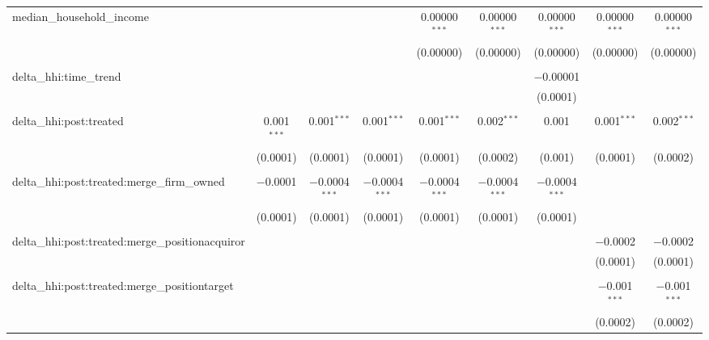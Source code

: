 \begin{table}[H]
{\begin{tabular}{@{\extracolsep{5pt}}lcccccccc}
  median\_household\_income &  &  &  & 0.00000$^{***}$ & 0.00000$^{***}$ & 0.00000$^{***}$ & 0.00000$^{***}$ & 0.00000$^{***}$ \\  

   &  &  &  & (0.00000) & (0.00000) & (0.00000) & (0.00000) & (0.00000) \\  

   & & & & & & & & \\  

  delta\_hhi:time\_trend &  &  &  &  &  & $-$0.00001 &  &  \\  

   &  &  &  &  &  & (0.0001) &  &  \\  

   & & & & & & & & \\  

  delta\_hhi:post:treated & 0.001$^{***}$ & 0.001$^{***}$ & 0.001$^{***}$ & 0.001$^{***}$ & 0.002$^{***}$ & 0.001 & 0.001$^{***}$ & 0.002$^{***}$ \\  

   & (0.0001) & (0.0001) & (0.0001) & (0.0001) & (0.0002) & (0.001) & (0.0001) & (0.0002) \\  

   & & & & & & & & \\  

  delta\_hhi:post:treated:merge\_firm\_owned & $-$0.0001 & $-$0.0004$^{***}$ & $-$0.0004$^{***}$ & $-$0.0004$^{***}$ & $-$0.0004$^{***}$ & $-$0.0004$^{***}$ &  &  \\  

   & (0.0001) & (0.0001) & (0.0001) & (0.0001) & (0.0001) & (0.0001) &  &  \\  

   & & & & & & & & \\  

  delta\_hhi:post:treated:merge\_positionacquiror &  &  &  &  &  &  & $-$0.0002 & $-$0.0002 \\  

   &  &  &  &  &  &  & (0.0001) & (0.0001) \\  

   & & & & & & & & \\  

  delta\_hhi:post:treated:merge\_positiontarget &  &  &  &  &  &  & $-$0.001$^{***}$ & $-$0.001$^{***}$ \\  

   &  &  &  &  &  &  & (0.0002) & (0.0002) \\  


\end{tabular}}
\end{table}
